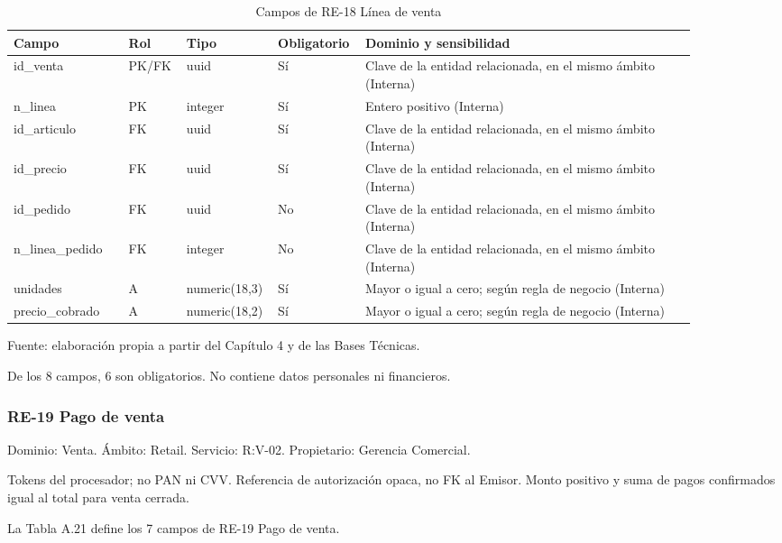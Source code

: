 \documentclass[11pt]{article}
\begin{document}
\begin{table}[htbp]
\caption{Campos de RE-18 Línea de venta}\label{tab:d_re18}
\centering
\begin{tabular}{@{}p{0.167\linewidth}p{0.070\linewidth}p{0.079\linewidth}p{0.097\linewidth}p{0.465\linewidth}@{}}
\toprule Campo & Rol & Tipo & Obligatorio & Dominio y sensibilidad \\
\midrule
id\_venta & PK/FK & uuid & Sí & Clave de la entidad relacionada, en el mismo ámbito (Interna) \\
n\_linea & PK & integer & Sí & Entero positivo (Interna) \\
id\_articulo & FK & uuid & Sí & Clave de la entidad relacionada, en el mismo ámbito (Interna) \\
id\_precio & FK & uuid & Sí & Clave de la entidad relacionada, en el mismo ámbito (Interna) \\
id\_pedido & FK & uuid & No & Clave de la entidad relacionada, en el mismo ámbito (Interna) \\
n\_linea\_pedido & FK & integer & No & Clave de la entidad relacionada, en el mismo ámbito (Interna) \\
unidades & A & numeric(18,3) & Sí & Mayor o igual a cero; según regla de negocio (Interna) \\
precio\_cobrado & A & numeric(18,2) & Sí & Mayor o igual a cero; según regla de negocio (Interna) \\
\bottomrule
\end{tabular}
\par\smallskip
{\raggedright Fuente: elaboración propia a partir del Capítulo 4 y de las Bases Técnicas.\par}
\end{table}


De los 8 campos, 6 son obligatorios. No contiene datos personales ni financieros.

\subsubsection{RE-19 Pago de venta}

Dominio: Venta. Ámbito: Retail. Servicio: R:V-02. Propietario: Gerencia Comercial.

Tokens del procesador; no PAN ni CVV. Referencia de autorización opaca, no FK al Emisor. Monto positivo y suma de pagos confirmados igual al total para venta cerrada.

La Tabla A.21 define los 7 campos de RE-19 Pago de venta.
\end{document}
